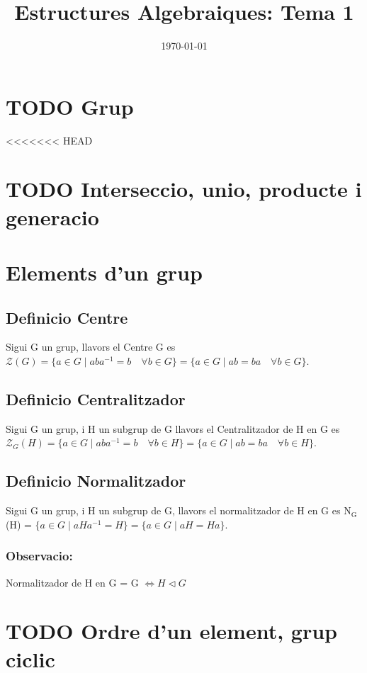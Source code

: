 \documentclass[11pt]{article}
\date{\today}
\title{Estructures Algebraiques: Tema 1}
\begin{document}
\maketitle
\setcounter{tocdepth}{4}
\tableofcontents


\section{{\bfseries\sffamily TODO} Grup}
<<<<<<< HEAD
\label{sec:orgb5e1a65}
\section{{\bfseries\sffamily TODO} Interseccio, unio, producte i generacio}
\label{sec:org9a70c74}
\section{Elements d'un grup}
\label{sec:orgf1497ba}
\subsection{Definicio Centre}
\label{sec:org28ffbe0}
Sigui G un grup, llavors el Centre G es \(\mathcal{Z}(G) = \{ a \in G \mid aba^{-1} = b \quad \forall b \in G \} = \{ a \in G \mid ab = ba \quad \forall b \in G \}\).

\subsection{Definicio Centralitzador}
\label{sec:orgcf82755}
Sigui G un grup, i H un subgrup de G llavors el Centralitzador de H en G es \(\mathcal{Z}_{G}(H) = \{ a \in G \mid aba^{-1} = b \quad \forall b \in H \} = \{ a \in G \mid ab = ba \quad \forall b \in H \}\).

\subsection{Definicio Normalitzador}
\label{sec:org873eeff}
Sigui G un grup, i H un subgrup de G, llavors el normalitzador de H en G es N\(_{\text{G}}\)(H) = \(\{ a \in G \mid aHa^{-1} = H \} = \{ a \in G \mid aH = Ha \}\).

\subsubsection{Observacio:}
\label{sec:org4dc1c75}
Normalitzador de H en G = G \(\iff H \vartriangleleft G\)
\section{{\bfseries\sffamily TODO} Ordre d'un element, grup ciclic}
\label{sec:org46c3a92}
\end{document}
